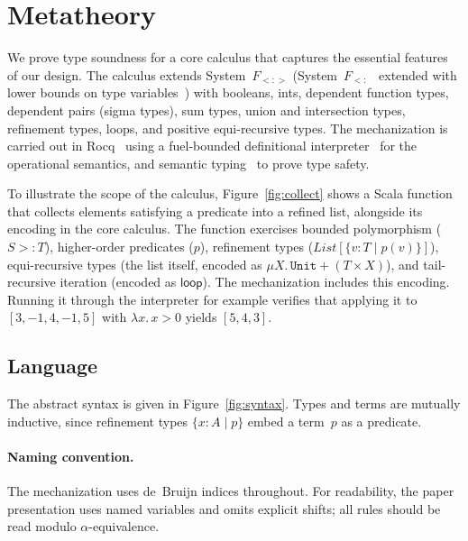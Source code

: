 \documentclass[acmsmall]{acmart}
\begin{document}
\section{Metatheory}\label{sec:formalization}

We prove type soundness for a core calculus that captures the essential features of our design. The calculus extends System~$F_{<:>}$ (System~$F_{<:}$~\cite{cardelli1991} extended with lower bounds on type variables~\cite{amin2017}) with booleans, ints, dependent function types, dependent pairs (sigma types), sum types, union and intersection types, refinement types, loops, and positive equi-recursive types. The mechanization is carried out in Rocq~\cite{rocq} using a fuel-bounded definitional interpreter~\cite{amin2017} for the operational semantics, and semantic typing~\cite{timany2024} to prove type safety.

To illustrate the scope of the calculus, Figure~\ref{fig:collect} shows a Scala function that collects elements satisfying a predicate into a refined list, alongside its encoding in the core calculus. The function exercises bounded polymorphism ($S >: T$), higher-order predicates ($p$), refinement types ($\mathit{List}[\{v : T \mid p(v)\}]$), equi-recursive types (the list itself, encoded as $\mu X.\, \texttt{Unit} + (T \times X)$), and tail-recursive iteration (encoded as $\textsf{loop}$). The mechanization includes this encoding. Running it through the interpreter for example verifies that applying it to $[3, -1, 4, -1, 5]$ with $\lambda x.\, x > 0$ yields $[5, 4, 3]$.



\subsection{Language}\label{sec:language}

The abstract syntax is given in Figure~\ref{fig:syntax}. Types and terms are mutually inductive, since refinement types $\{x : A \mid p\}$ embed a term~$p$ as a predicate.



\paragraph{Naming convention.}
The mechanization uses de~Bruijn indices throughout. For readability, the paper presentation uses named variables and omits explicit shifts; all rules should be read modulo $\alpha$-equivalence.
\end{document}
